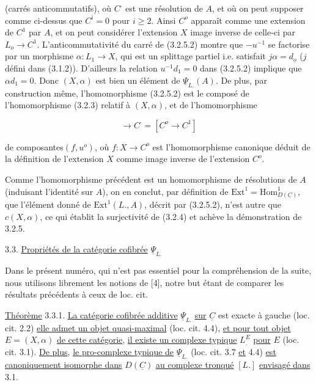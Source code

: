 (carrés anticommutatifs), où $C^{\cdot}$ est une résolution de $A$, et où on peut supposer comme ci-dessus que $C^i=0$ pour $i \geqslant 2$. Ainsi $C^o$ apparaît comme une extension de $C^1$ par $A$, et on peut considérer l'extension $X$ image inverse de celle-ci par $L_o \to C^1$. L'anticommutativité du carré de (3.2.5.2) montre que $-u^{-1}$ se factorise par un morphisme $\alpha : L_1 \longrightarrow X$, qui est un splittage partiel i.e. satisfait $j\alpha = d_o$ ($j$ défini dans (3.1.2)). D'ailleurs la relation $u^{-1}d_1 = 0$ dans (3.2.5.2) implique que $\alpha d_1 = 0$. Donc $(X,\alpha)$ est bien un élément de $\underline{\Psi}_{L.}(A)$. De plus, par construction même, l'homomorphisme (3.2.5.2) est le composé de l'homomorphisme (3.2.3) relatif à $(X,\alpha)$, et de l'homomorphisme

\begin{equation*}
[X \longrightarrow L_o] \longrightarrow C^{\cdot} = [C^o \longrightarrow C^1] 
\end{equation*}


 de composantes$(f,u^o)$, où $f: X \longrightarrow C^o$ est l'homomorphisme canonique déduit de la définition de l'extension $X$ comme image inverse de l'extension $C^o$.

Comme l'homomorphisme précédent est un homomorphisme de résolutions de $A$ (induisant l'identité sur $A$), on en conclut, par définition de $\mathrm{Ext}^1 = \mathrm{Hom}^1_{D(\underline{C})}$, que l'élément donné de $\mathrm{Ext}^1(L.,A)$, décrit par (3.2.5.2), n'est autre que $c(X,\alpha)$, ce qui établit la surjectivité de (3.2.4) et achève la démonstration de 3.2.5.


3.3. \underline{Propriétés de la catégorie cofibrée} $\underline{\Psi}_{L.}$

Dans le présent numéro, qui n'est pas essentiel pour la compréhension de la suite, nous utilisons librement les notions de [4], notre but étant de comparer les résultats précédents à ceux de loc. cit.

\underline{Théorème} 3.3.1. \underline{La catégorie cofibrée additive} $\underline{\Psi}_{L.}$ \underline{sur} $\underline{C}$ est exacte à gauche (loc. cit. 2.2) \underline{elle admet un objet quasi-maximal} (loc. cit. 4.4), \underline{et pour tout objet} $E = (X,\alpha)$ \underline{de cette catégorie}, \underline{il existe un complexe typique} $L^E_{.}$ \underline{pour} $E$ (loc. cit. 3.1). \underline{De plus}, \underline{le pro-complexe typique de} $\underline{\Psi}_{L.}$ (loc. cit. 3.7 \underline{et} 4.4) \underline{est canoniquement isomorphe dans} $D(\underline{C})$ \underline{au complexe tronqué} $[L.]$ \underline{envisagé dans} 3.1.

